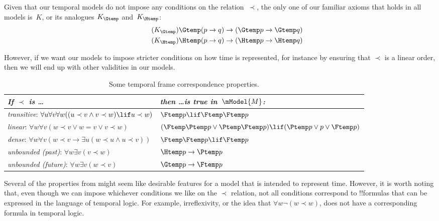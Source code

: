 \documentclass[../../../include/open-logic-section]{subfiles}
\begin{document}


Given that our temporal models do not impose any conditions on the relation~$\prec$, the only one of our familiar axioms
that holds in all models is~$K$, or its analogues $K_{\Gtemp}$ and~$K_{\Htemp}$:
\begin{align*}
\tag{$K_{\Gtemp}$}  \Gtemp (p \to q) & \to (\Gtemp p \to \Gtemp q)\\
\tag{$K_{\Htemp}$}  \Htemp (p \to q) & \to (\Htemp p \to \Htemp q)
\end{align*}

However, if we want our models to impose stricter conditions on how time is represented, for instance by ensuring that
$\prec$ is a linear order, then we will end up with other validities in our models.

\begin{table}[t]
    \begin{tabular}{| p{} || p{} |}
      \hline
      {\emph{If $\prec$ is \dots}} & {\emph{then \dots is true in~$\mModel{M}$:}} \\
      \hline \hline
      \emph{transitive}: \newline
      $\forall u \forall v \forall w ((u \prec v \land v \prec w) \lif u \prec w)$ & 
      $\Ftemp p \lif \Ftemp \Ftemp p$  \\
      \hline 
      \emph{linear}: \newline
      $\forall w \forall v (w \prec v \lor w = v \lor v \prec w)$ &  
      $(\Ftemp \Ptemp  p \lor \Ptemp \Ftemp p) \lif (\Ptemp p \lor p \lor \Ftemp p)$ \\
      \hline
      \emph{dense}: \newline
      $\forall w \forall v (w \prec v \to \exists u(w \prec u \land u \prec v))$ &  
      $\Ftemp \Ftemp p \lif \Ftemp p$ \\
      \hline
      \emph{unbounded (past)}: \newline
      $\forall w \exists v( v \prec w)$ &  
      $\Htemp p \to \Ptemp p$ \\
      \hline
      \emph{unbounded (future)}: \newline
      $\forall w \exists v( w \prec v)$ &  
      $\Gtemp p \to \Ftemp p$ \\

      \hline

    \end{tabular}
    \caption{Some temporal frame correspondence properties.}
  \end{table} 

Several of the properties from  might seem like desirable features 
for a model that is intended to
represent time. However, it is worth noting that, even though we can impose whichever conditions 
we like on the $\prec$ relation, not all conditions correspond to !!{formula}s that can be expressed in
the language of temporal logic. For example, irreflexivity, or the idea that $\forall w \lnot (w \prec w)$,
does not have a corresponding formula in temporal logic. 
\end{document}
